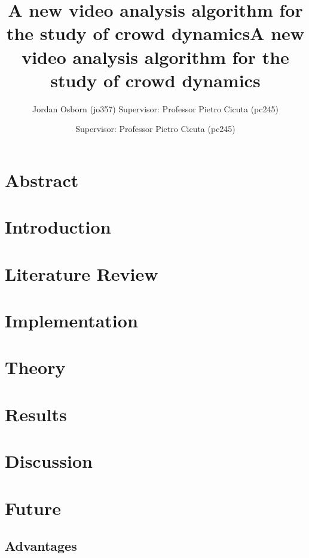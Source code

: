 \documentclass[11pt]{article}
\title{A new video analysis algorithm for the study of crowd dynamics}
\author{Jordan Osborn (jo357) Supervisor: Professor Pietro Cicuta (pc245)}
\begin{document}
\begin{titlingpage}
    \maketitle
\end{titlingpage}


\clearpage

\title{A new video analysis algorithm for the study of crowd dynamics}
\author{Supervisor: Professor Pietro Cicuta (pc245)}
\maketitle
\section*{Abstract}

\clearpage
\tableofcontents
\clearpage
\section{Introduction}

\section{Literature Review}

\section{Implementation}

\section{Theory}

\section{Results}

\section{Discussion}

\section{Future}
\subsection{Advantages}
\end{document}
